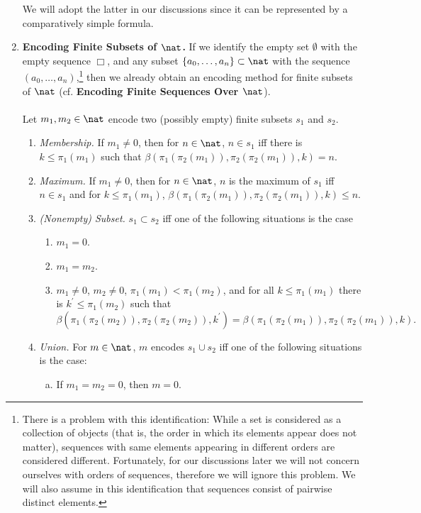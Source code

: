 \begin{enumerate}[1.]
We will adopt the latter in our discussions since it can be represented by a comparatively simple formula.
%
\item \textbf{Encoding Finite Subsets of $\nat$.} If we identify the empty set $\emptyset$ with the empty sequence $\Box$, and any subset $\{ a_0, \ldots, a_n \} \subset \nat$ with the sequence $(a_0, \ldots, a_n)$,\footnote{There is a problem with this identification: While a set is considered as a collection of objects (that is, the order in which its elements appear does not matter), sequences with same elements appearing in different orders are considered different. Fortunately, for our discussions later we will not concern ourselves with orders of sequences, therefore we will ignore this problem. We will also assume in this identification that sequences consist of pairwise distinct elements.} then we already obtain an encoding method for finite subsets of $\nat$ (cf. \textbf{Encoding Finite Sequences Over $\nat$}).\\
\ \\
Let $m_1, m_2 \in \nat$ encode two (possibly empty) finite subsets $s_1$ and $s_2$.
\begin{enumerate}[(1)]
\item \textit{Membership.} If $m_1 \neq 0$, then for $n \in \nat$, $n \in s_1$ iff there is $k \leq \pi_1 (m_1)$ such that $\beta ( \pi_1 (\pi_2 (m_1)), \pi_2 (\pi_2 (m_1)), k) = n$.
\item \textit{Maximum.} If $m_1 \neq 0$, then for $n \in \nat$, $n$ is the maximum of $s_1$ iff $n \in s_1$ and for $k \leq \pi_1 (m_1)$, $\beta ( \pi_1 ( \pi_2 (m_1)), \pi_2 ( \pi_2 (m_1)), k) \leq n$.
\item \textit{(Nonempty) Subset.} $s_1 \subset s_2$ iff one of the following situations is the case
\begin{enumerate}[(1)]
\item $m_1 = 0$.
\item $m_1 = m_2$.
\item $m_1 \neq 0$, $m_2 \neq 0$, $\pi_1 (m_1) < \pi_1 (m_2)$, and for all $k \leq \pi_1 (m_1)$ there is $k^\prime \leq \pi_1 (m_2)$ such that
\[
\beta (\pi_1 (\pi_2 (m_2)), \pi_2 ( \pi_2 (m_2)), k^\prime) = \beta (\pi_1 (\pi_2 (m_1)), \pi_2 (\pi_2 (m_1)), k).
\]
\end{enumerate}
\item \textit{Union.} For $m \in \nat$, $m$ encodes $s_1 \cup s_2$ iff one of the following situations is the case:
\begin{enumerate}[(a)]
\item If $m_1 = m_2 = 0$, then $m = 0$.

\end{enumerate}
\end{enumerate}
\end{enumerate}
